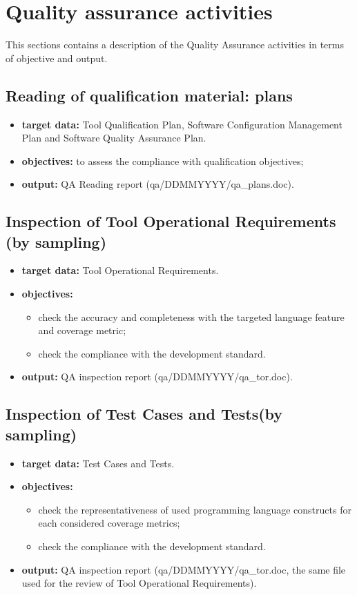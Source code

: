 \documentclass {report}
\begin{document}
\chapter{Quality assurance activities}
This sections contains a description of the Quality Assurance activities in terms of objective and output.

\section{Reading of \xcov qualification material: plans}
\begin{itemize}
\item \textbf{target data:} Tool Qualification Plan, Software Configuration Management Plan and Software Quality Assurance Plan.
\item \textbf{objectives:} to assess the compliance with qualification objectives;
\item \textbf{output:} QA Reading report (qa/DDMMYYYY/qa\_plans.doc).
\end{itemize}

\section{Inspection of Tool Operational Requirements (by sampling)}
\begin{itemize}
\item \textbf{target data:} Tool Operational Requirements.
\item \textbf{objectives:}
\begin{itemize}
\item check the accuracy and completeness with the targeted language feature and coverage metric;
\item check the compliance with the development standard.
\end{itemize}
\item \textbf{output:} QA inspection report (qa/DDMMYYYY/qa\_tor.doc).
\end{itemize}

\section{Inspection of Test Cases and Tests(by sampling)}
\begin{itemize}
\item \textbf{target data:} Test Cases and Tests.
\item \textbf{objectives:}
\begin{itemize}
\item check the representativeness of used programming language constructs for each considered coverage metrics;
\item check the compliance with the development standard.
\end{itemize}
\item \textbf{output:} QA inspection report (qa/DDMMYYYY/qa\_tor.doc, the same file used for the review of Tool Operational Requirements).
\end{itemize}
\end{document}
